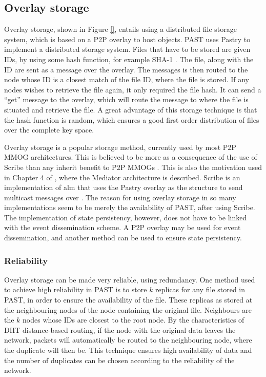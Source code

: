 \documentclass[10pt,a4paper,journal,cspaper,compsoc]{IEEEtran}
\begin{document}
\subsection{Overlay storage}
\label{overlay_storage}

Overlay storage, shown in Figure \ref{}, entails using a distributed file storage system, which is based on a P2P overlay to host objects. PAST
\cite{PAST_storage} uses Pastry to implement a distributed storage system. Files that have to be stored are given IDs, by using some hash function,
for example SHA-1 \cite{SHA}. The file, along with the ID are sent as a message over the overlay. The messages is then routed to the node whose ID is
a closest match of the file ID, where the file is stored. If any nodes wishes to retrieve the file again, it only required the file hash. It can send
a ``get'' message to the overlay, which will route the message to where the file is situated and retrieve the file. A great advantage of this storage
technique is that the hash function is random, which ensures a good first order distribution of files over the complete key space.

Overlay storage is a popular storage method, currently used by most P2P MMOG architectures. This is believed to be more as a consequence of the use
of Scribe than any inherit benefit to P2P MMOGs \cite{past_storage_focus}. This is also the motivation used in Chapter 4 of \cite{Fan_phd}, where the
Mediator architecture is described. Scribe is an implementation of \ac{alm} that uses the Pastry overlay as the structure to send multicast messages
over \cite{scribe}. The reason for using overlay storage in so many implementations seem to be merely the availability of PAST, after using Scribe.
The implementation of state persistency, however, does not have to be linked with the event dissemination scheme. A P2P overlay may be used for event
dissemination, and another method can be used to ensure state persistency.

\subsubsection{Reliability}
\label{overlay_storage_reliability}

Overlay storage can be made very reliable, using redundancy. One method used to achieve high reliability in PAST is to store $k$ replicas for any
file stored in PAST, in order to ensure the availability of the file. These replicas as stored at the neighbouring nodes of the node containing the
original file. Neighbours are the $k$ nodes whose IDs are closest to the root node. By the characteristics of DHT distance-based routing, if the node
with the original data leaves the network, packets will automatically be routed to the neighbouring node, where the duplicate will then be. This
technique ensures high availability of data and the number of duplicates can be chosen according to the reliability of the network.
\end{document}
